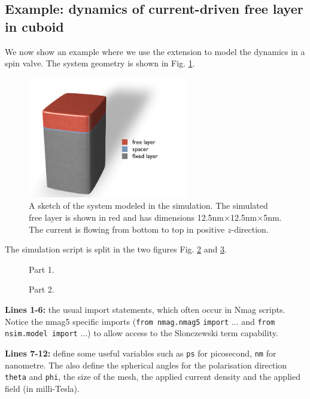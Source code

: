 \documentclass[11pt,oneside,openany]{article}
\begin{document}
\subsection{Example: dynamics of current-driven free layer in cuboid}
We now show an example where we use the extension to model the dynamics
in a spin valve.
The system geometry is shown in Fig. \ref{fig:sketch}.
%
\begin{figure}
\begin{center}
\includegraphics[width=7.0cm]{geometry.png}
\caption[Sketch]{A sketch of the system modeled in the simulation. The simulated free layer is shown in red and has dimensions 12.5nm$\times$12.5nm$\times$5nm. The current is flowing from bottom to top in positive $z$-direction.}
\label{fig:sketch}
\end{center}
\end{figure}
%
The simulation script is split in the two figures Fig. \ref{fig:script1of2} and
\ref{fig:script2of2}. 

\begin{figure}[!p]

\caption{Part 1.}
\label{fig:script1of2}
\end{figure}

\begin{figure}[!h]

\caption{Part 2.}
\label{fig:script2of2}
\end{figure}

\textbf{Lines 1-6:} the usual import statements, which often occur in
Nmag scripts. Notice the nmag5 specific imports
(\verb|from nmag.nmag5| \verb|import| $\ldots$ and \verb|from|
\verb|nsim.model import| $\ldots$) to allow access to the Slonczewski
term capability.

\textbf{Lines 7-12:} define some useful variables such as \verb|ps|
for picosecond, \verb|nm| for nanometre.  The also define the
spherical angles for the polarisation direction \verb|theta| and
\verb|phi|, the size of the mesh, the applied current density and the
applied field (in milli-Tesla).
\end{document}
